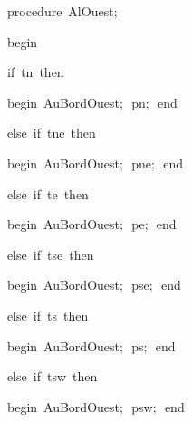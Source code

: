 {\pagebreak[3] 
\vspace{\neglskip}\mbox{\blc  \blk\idt  \mcl procedure\idt \ AlOuest$;$}\par 
\vspace{\neglskip}\mbox{\blc  \blk\idt  \mcl begin\idt }\par 
\pagebreak[3] 
\vspace{\neglskip}\mbox{\blc  \blk\blk\idt  \mcl if\idt \ tn\ \mcl then\idt }\par 
\vspace{\neglskip}\mbox{\blc  \blk\blk\blk\idt  \mcl begin\idt \ AuBordOuest$;$\ pn$;$\ \mcl end\idt }\par 
\pagebreak[3] 
\vspace{\neglskip}\mbox{\blc  \blk\blk\idt  \mcl else\idt \ \mcl if\idt \ tne\ \mcl then\idt }\par 
\vspace{\neglskip}\mbox{\blc  \blk\blk\blk\idt  \mcl begin\idt \ AuBordOuest$;$\ pne$;$\ \mcl end\idt }\par 
\pagebreak[3] 
\vspace{\neglskip}\mbox{\blc  \blk\blk\idt  \mcl else\idt \ \mcl if\idt \ te\ \mcl then\idt }\par 
\vspace{\neglskip}\mbox{\blc  \blk\blk\blk\idt  \mcl begin\idt \ AuBordOuest$;$\ pe$;$\ \mcl end\idt }\par 
\pagebreak[3] 
\vspace{\neglskip}\mbox{\blc  \blk\blk\idt  \mcl else\idt \ \mcl if\idt \ tse\ \mcl then\idt }\par 
\vspace{\neglskip}\mbox{\blc  \blk\blk\blk\idt  \mcl begin\idt \ AuBordOuest$;$\ pse$;$\ \mcl end\idt }\par 
\pagebreak[3] 
\vspace{\neglskip}\mbox{\blc  \blk\blk\idt  \mcl else\idt \ \mcl if\idt \ ts\ \mcl then\idt }\par 
\vspace{\neglskip}\mbox{\blc  \blk\blk\blk\idt  \mcl begin\idt \ AuBordOuest$;$\ ps$;$\ \mcl end\idt }\par 
\pagebreak[3] 
\vspace{\neglskip}\mbox{\blc  \blk\blk\idt  \mcl else\idt \ \mcl if\idt \ tsw\ \mcl then\idt }\par 
\vspace{\neglskip}\mbox{\blc  \blk\blk\blk\idt  \mcl begin\idt \ AuBordOuest$;$\ psw$;$\ \mcl end\idt }\par 
\pagebreak[3] 
}
